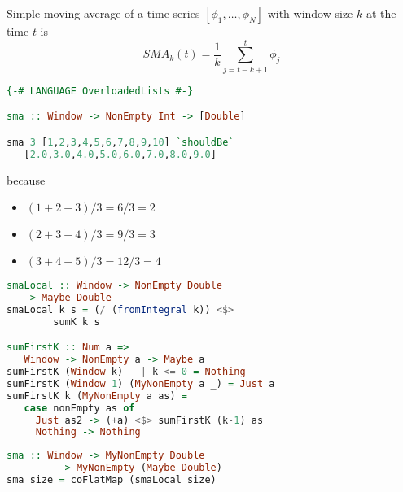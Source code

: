 \documentclass[10pt]{beamer}
\begin{document}
\begin{frame}[fragile]
  Simple moving average of a time series $[\phi_{1}, \ldots, \phi_{N}]$ with window size $k$ at the time $t$ is
  \begin{equation} 
    SMA_{k}(t) = \frac{1}{k} \sum_{j = t - k + 1}^{t} \phi_{j}
  \end{equation}
\end{frame}


\begin{frame}[fragile]
\begin{lstlisting}[language=haskell, basicstyle=\ttfamily]
{-# LANGUAGE OverloadedLists #-}

sma :: Window -> NonEmpty Int -> [Double]

sma 3 [1,2,3,4,5,6,7,8,9,10] `shouldBe`
   [2.0,3.0,4.0,5.0,6.0,7.0,8.0,9.0]
\end{lstlisting}
because 
\begin{itemize}
   \item  
     $(1+2+3) / 3 = 6/3 = 2$
    \item $(2+3+4) / 3 = 9/3 = 3$
    \item $(3+4+5) / 3 = 12/3 = 4$
\end{itemize}
\end{frame}

\begin{frame}[fragile]
\begin{lstlisting}[language=haskell, basicstyle=\ttfamily]
smaLocal :: Window -> NonEmpty Double 
   -> Maybe Double
smaLocal k s = (/ (fromIntegral k)) <$>
        sumK k s

sumFirstK :: Num a => 
   Window -> NonEmpty a -> Maybe a
sumFirstK (Window k) _ | k <= 0 = Nothing
sumFirstK (Window 1) (MyNonEmpty a _) = Just a
sumFirstK k (MyNonEmpty a as) = 
   case nonEmpty as of
     Just as2 -> (+a) <$> sumFirstK (k-1) as
     Nothing -> Nothing
\end{lstlisting}
\end{frame}
\begin{frame}[fragile]
\begin{lstlisting}[language=haskell, basicstyle=\ttfamily]
sma :: Window -> MyNonEmpty Double 
         -> MyNonEmpty (Maybe Double)
sma size = coFlatMap (smaLocal size)
\end{lstlisting}
\end{frame}
\end{document}
